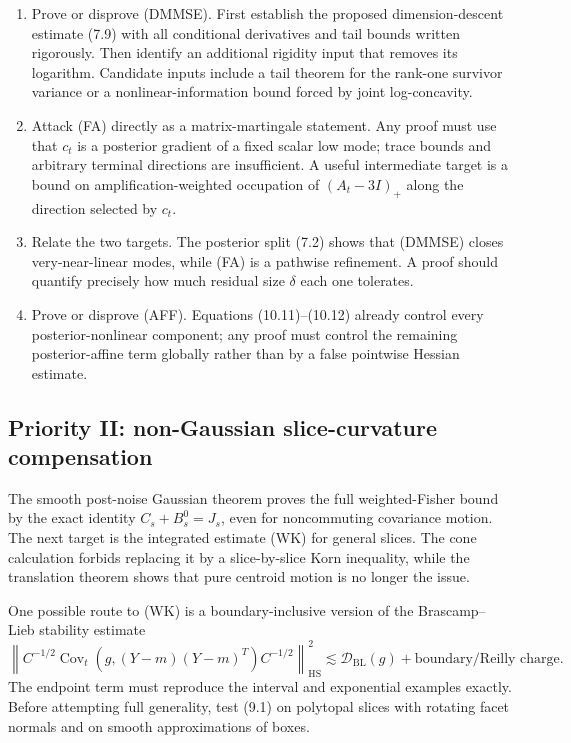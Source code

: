 \documentclass[11pt]{article}
\theoremstyle{definition}
\theoremstyle{remark}
\newcommand{\Cov}{\operatorname{Cov}}
\newcommand{\HS}{\mathrm{HS}}
\newcommand{\1}{\mathbf 1}
\newcommand{\norm}[1]{\left\lVert #1\right\rVert}
\begin{document}
\begin{enumerate}
\item Prove or disprove (DMMSE).  First establish the proposed
dimension-descent estimate (7.9) with all conditional derivatives and tail
bounds written rigorously.  Then identify an additional rigidity input
that removes its logarithm.  Candidate inputs include a tail theorem for
the rank-one survivor variance or a nonlinear-information bound forced by
joint log-concavity.

\item Attack (FA) directly as a matrix-martingale statement.  Any proof
must use that \(c_t\) is a posterior gradient of a fixed scalar low mode;
trace bounds and arbitrary terminal directions are insufficient.  A useful
intermediate target is a bound on amplification-weighted occupation of
\((A_t-3I)_+\) along the direction selected by \(c_t\).

\item Relate the two targets.  The posterior split (7.2) shows that
(DMMSE) closes very-near-linear modes, while (FA) is a pathwise refinement.
A proof should quantify precisely how much residual size \(\delta\) each
one tolerates.

\item Prove or disprove (AFF).  Equations (10.11)--(10.12) already control
every posterior-nonlinear component; any proof must control the remaining
posterior-affine term globally rather than by a false pointwise Hessian
estimate.
\end{enumerate}

\subsection{Priority II: non-Gaussian slice-curvature compensation}

The smooth post-noise Gaussian theorem proves the full weighted-Fisher
bound by the exact identity \(C_s+B_s^0=J_s\), even for noncommuting
covariance motion.  The next target is the integrated estimate (WK) for
general slices.  The cone calculation forbids replacing it by a
slice-by-slice Korn inequality, while the translation theorem shows that
pure centroid motion is no longer the issue.

One possible route to (WK) is a boundary-inclusive version of the
Brascamp--Lieb stability estimate
\[
 \norm{C^{-1/2}\Cov_t(g,(Y-m)(Y-m)^T)C^{-1/2}}_{\HS}^2
 \lesssim \mathcal D_{\mathrm{BL}}(g)
 +\text{boundary/Reilly charge}.                     \tag{9.1}
\]
The endpoint term must reproduce the interval and exponential examples
exactly.  Before attempting full generality, test (9.1) on polytopal slices
with rotating facet normals and on smooth approximations of boxes.
\end{document}
